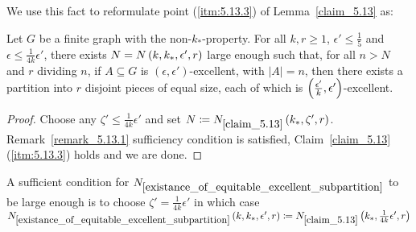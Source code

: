     We use this fact to reformulate point (\ref{itm:5.13.3}) of Lemma~\ref{claim_5.13} as:

    \lemma[Claim 5.13.2(3)]\label{existance_of_equitable_excellent_subpartition}
        Let $G$ be a finite graph with the non-$k_*$-property.
        For all $k, r \geq 1$, $\epsilon' \leq \frac{1}{5}$ and $\epsilon \leq \frac{1}{4k} \epsilon'$, there exists
        $N = N\left( k, k_*, \epsilon', r \right)$ large enough such that, for all $n > N$ and $r$ dividing $n$,
        if $A \subseteq G$ is $\left( \epsilon, \epsilon' \right)$-excellent, with $|A| = n$, then there exists a
        partition into $r$ disjoint pieces of equal size, each of which is $\left( \frac{\epsilon'}{k}, \epsilon' \right)$-excellent.
        \begin{proof}
            Choose any $\zeta' \leq \frac{1}{4k} \epsilon'$ and set $N \coloneq N_{\ref{claim_5.13}}\left( k_*, \zeta', r \right)$.
            Remark~\ref{remark_5.13.1} sufficiency condition is satisfied, Claim~\ref{claim_5.13} (\ref{itm:5.13.3}) holds
            and we are done.
        \end{proof}

    \begin{remark}
        A sufficient condition for $N_{\ref{existance_of_equitable_excellent_subpartition}}$ to be large enough is
        to choose $\zeta' = \frac{1}{4k} \epsilon'$ in which case
        $N_{\ref{existance_of_equitable_excellent_subpartition}}\left( k, k_*, \epsilon', r \right) \coloneq
        N_{\ref{claim_5.13}}\left( k_*, \frac{1}{4k} \epsilon', r \right)$
    \end{remark}

